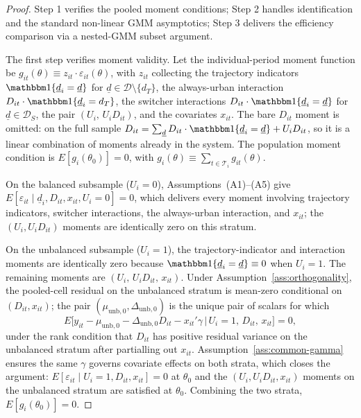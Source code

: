 \begin{proof}
Step 1 verifies the pooled moment conditions; Step 2 handles identification and the standard non-linear GMM asymptotics; Step 3 delivers the efficiency comparison via a nested-GMM subset argument.

The first step verifies moment validity.
Let the individual-period moment function be $g_{it}(\theta) \equiv z_{it}\cdot\varepsilon_{it}(\theta)$, with $z_{it}$ collecting the trajectory indicators $\mathbbm 1\{\underline d_i=\underline d\}$ for $\underline d \in \mathcal D\setminus\{d_T\}$, the always-urban interaction $D_{it}\cdot\mathbbm 1\{\underline d_i=d_T\}$, the switcher interactions $D_{it}\cdot\mathbbm 1\{\underline d_i=\underline d\}$ for $\underline d \in \mathcal D_S$, the pair $(U_i,\,U_i D_{it})$, and the covariates $x_{it}$.
The bare $D_{it}$ moment is omitted: on the full sample $D_{it} = \sum_{\underline d} D_{it}\cdot\mathbbm 1\{\underline d_i=\underline d\} + U_i D_{it}$, so it is a linear combination of moments already in the system.
The population moment condition is $E[g_i(\theta_0)] = 0$, with $g_i(\theta) \equiv \sum_{t\in\mathcal T_i} g_{it}(\theta)$.

On the balanced subsample ($U_i=0$), Assumptions~(A1)--(A5) give $E[\varepsilon_{it}\mid\underline d_i, D_{it}, x_{it}, U_i=0] = 0$, which delivers every moment involving trajectory indicators, switcher interactions, the always-urban interaction, and $x_{it}$; the $(U_i,U_iD_{it})$ moments are identically zero on this stratum.

On the unbalanced subsample ($U_i=1$), the trajectory-indicator and interaction moments are identically zero because $\mathbbm 1\{\underline d_i=\underline d\}\equiv 0$ when $U_i=1$.
The remaining moments are $(U_i,\,U_i D_{it},\,x_{it})$.
Under Assumption~\ref{ass:orthogonality}, the pooled-cell residual on the unbalanced stratum is mean-zero conditional on $(D_{it},x_{it})$; the pair $(\mu_{\mathrm{unb},0},\Delta_{\mathrm{unb},0})$ is the unique pair of scalars for which
\[
E\big[y_{it} - \mu_{\mathrm{unb},0} - \Delta_{\mathrm{unb},0} D_{it} - x_{it}'\gamma \,\big|\, U_i=1,\,D_{it},\,x_{it}\big] = 0,
\]
under the rank condition that $D_{it}$ has positive residual variance on the unbalanced stratum after partialling out $x_{it}$.
Assumption~\ref{ass:common-gamma} ensures the same $\gamma$ governs covariate effects on both strata, which closes the argument: $E[\varepsilon_{it}\mid U_i=1,D_{it},x_{it}]=0$ at $\theta_0$ and the $(U_i,U_iD_{it},x_{it})$ moments on the unbalanced stratum are satisfied at $\theta_0$.
Combining the two strata, $E[g_i(\theta_0)]=0$.


\end{proof}

